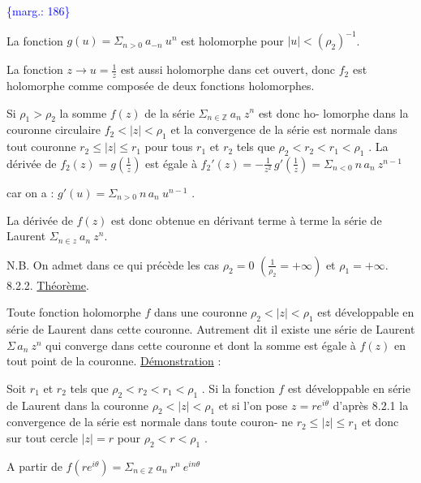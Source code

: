 \documentclass[11pt]{article}
\newcommand{\scanpage}[1]{\par\bigskip\noindent{\small\sffamily[scan #1]}\par}
\newcommand{\mspage}[1]{{\small\sffamily[p.\,#1]}}
\newcommand{\margin}[1]{\textcolor{blue}{\{\textsf{marg.:} #1\}}}
\newcommand{\uline}[1]{\underline{#1}}
\begin{document}
\margin{186}

\clearpage
\scanpage{119/187}
\mspage{- 6 -}

La fonction $g(u) = \Sigma_{n > 0}\ a_{-n}\ u^{n}$ est holomorphe pour $|u| < (\rho_2)^{-1}$.

La fonction $z \longrightarrow u = \frac{1}{z}$ est aussi holomorphe dans cet ouvert, donc $f_2$ est
holomorphe comme composée de deux fonctions holomorphes.

Si $\rho_1 > \rho_2$ la somme $f(z)$ de la série $\Sigma_{n \in \mathbb{Z}}\ a_n\ z^{n}$ est donc ho-%
lomorphe dans la couronne circulaire $f_2 < |z| < \rho_1$ et la convergence de la
série est normale dans tout couronne $r_2 \leq |z| \leq r_1$ pour tous $r_1$ et $r_2$ tels
que $\rho_2 < r_2 < r_1 < \rho_1$ .
La dérivée de $f_2(z) = g(\frac{1}{z})$ est égale à $f_2'(z) = - \frac{1}{z^2}\, g'(\frac{1}{z}) = \Sigma_{n < 0}\ n\, a_n\ z^{n-1}$

car on a : \quad $g'(u) = \Sigma_{n > 0}\ n\, a_n\ u^{n-1}$ .

La dérivée de $f(z)$ est donc obtenue en dérivant terme à terme la série de
Laurent $\Sigma_{n \in z}\ a_n\ z^{n}$.

N.B. On admet dans ce qui précède les cas $\rho_2 = 0$ $(\frac{1}{\rho_2} = + \infty)$ et $\rho_1 = + \infty$.
8.2.2. \uline{Théorème}.

Toute fonction holomorphe $f$ dans une couronne $\rho_2 < |z| < \rho_1$ est
développable en série de Laurent dans cette couronne.
Autrement dit il existe une série de Laurent $\Sigma\, a_n\ z^{n}$ qui converge dans cette
couronne et dont la somme est égale à $f(z)$ en tout point de la couronne.
\uline{Démonstration} :

Soit $r_1$ et $r_2$ tels que $\rho_2 < r_2 < r_1 < \rho_1$ . Si la fonction $f$ est
développable en série de Laurent dans la couronne $\rho_2 < |z| < \rho_1$ et si l'on pose
$z = re^{i\theta}$ d'après 8.2.1 la convergence de la série est normale dans toute couron-%
ne $r_2 \leq |z| \leq r_1$ et donc sur tout cercle $|z| = r$ pour $\rho_2 < r < \rho_1$ .

A partir de $f(re^{i\theta}) = \Sigma_{n \in \mathbb{Z}}\ a_n\ r^{n}\ e^{in\theta}$
\end{document}
